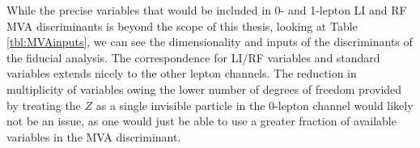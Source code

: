 While the precise variables that would be included in 0- and 1-lepton LI and RF MVA discriminants is beyond the scope of this thesis, looking at Table \ref{tbl:MVAinputs}, we can see the dimensionality and inputs of the discriminants of the fiducial analysis.  The correspondence for LI/RF variables and standard variables extends nicely to the other lepton channels.  The reduction in multiplicity of variables owing the lower number of degrees of freedom provided by treating the $Z$ as a single invisible particle in the 0-lepton channel would likely not be an issue, as one would just be able to use a greater fraction of available variables in the MVA discriminant.

